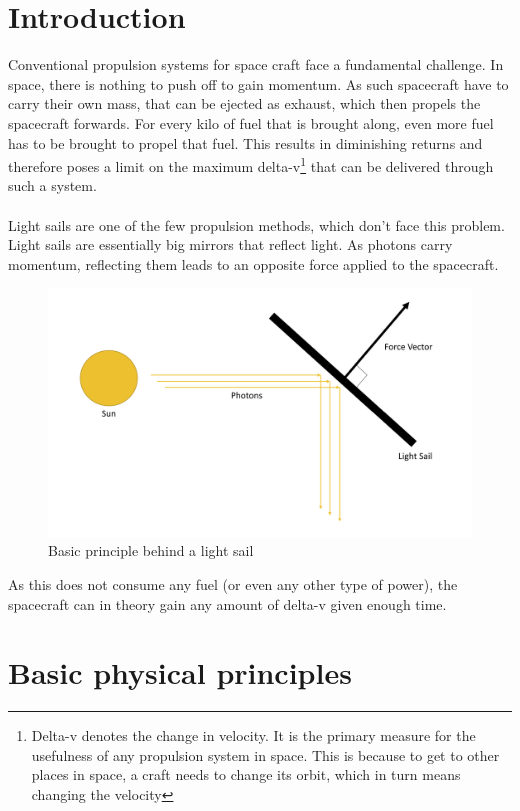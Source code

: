 \documentclass[14pt]{article}
\begin{document}
\section{Introduction}
Conventional propulsion systems for space craft face a fundamental challenge. 
In space, there is nothing to push off to gain momentum. As such spacecraft have to carry their
own mass, that can be ejected as exhaust, which then propels the spacecraft forwards. For every kilo
of fuel that is brought along, even more fuel has to be brought to propel that fuel. This results in
diminishing returns and therefore poses a limit on the maximum delta-v\footnote{Delta-v denotes the change in velocity.
It is the primary measure for the usefulness of any propulsion system in space. This is because to get to other places in space,
a craft needs to change its orbit, which in turn means changing the velocity} that can be delivered through
such a system\autocite{dunbar}.\\
\\
Light sails are one of the few propulsion methods, which don't face this problem. Light sails are essentially big mirrors that reflect
light. As photons carry momentum, reflecting them leads to an opposite force applied to the spacecraft.

\begin{figure}[H]
  \centering
  \includegraphics[width=14cm]{./resources/solar_sail.png}
  \caption{Basic principle behind a light sail}
  \label{fig:sail_principle}
\end{figure}

As this does not consume any fuel (or even any other type of power), the spacecraft can in theory gain any amount of delta-v given enough time.

\section{Basic physical principles}
\end{document}
